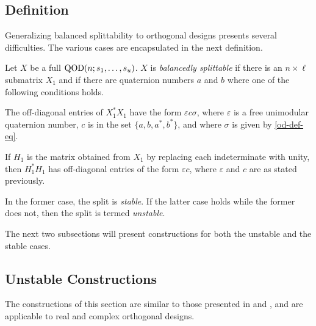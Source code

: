 \documentclass[../../../main]{subfiles}
\begin{document}
\subsection{Definition}

Generalizing balanced splittability to orthogonal designs presents several
difficulties. The various cases are encapsulated in the next definition. 

\begin{defin}
 Let $X$ be a full $\text{QOD}(n;s_1, \dots, s_u)$. $X$ is {\it balancedly splittable}
 if there is an $n \times \ell$ submatrix $X_1$ and if there are quaternion
 numbers $a$ and $b$ where one of the following conditions holds.
 \begin{defenum}
 \item The off-diagonal entries of $X_1^*X_1$ have the form $\varepsilon
   c\sigma$, where $\varepsilon$ is a free unimodular quaternion number, $c$ is
   in the set $\{a,b,a^*,b^*\}$, and where $\sigma$ is given by \ref{od-def-eq}.
 \item If $H_1$ is the matrix obtained from $X_1$ by replacing each
   indeterminate with unity, then $H_1^*H_1$ has off-diagonal entries of the
   form $\varepsilon c$, where $\varepsilon$ and $c$ are as stated previously.
 \end{defenum}
 In the former case, the split is {\it stable}. If the latter case holds while
 the former does not, then the split is termed {\it unstable}.
\end{defin}

The next two subsections will present constructions for both the unstable and
the stable cases. 

\dinkus

\subsection{Unstable Constructions}

The constructions of this section are similar to those presented in \cite{fender-quh} and \cite{pender_2020}, and are applicable to real and complex orthogonal designs.
\end{document}
